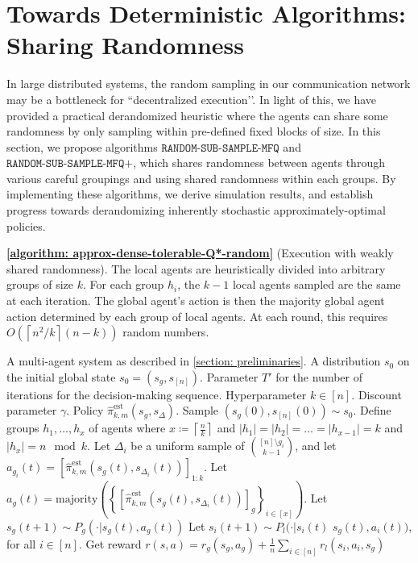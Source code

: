 \documentclass{article}
\theoremstyle{plain}
\theoremstyle{definition}
\def\ceil#1{\left\lceil #1 \right\rceil}
\def\est{\mathrm{est}}
\begin{document}



\section{Towards Deterministic Algorithms: Sharing Randomness}
\label{determinism}

 In large distributed systems, the random sampling in our communication network may be a bottleneck for ``decentralized execution’’. In light of this, we have provided a practical derandomized heuristic where the agents can share some randomness by only sampling within pre-defined fixed blocks of size. In this section, we propose algorithms $\texttt{RANDOM-SUB-SAMPLE-MFQ}$ and $\texttt{RANDOM-SUB-SAMPLE-MFQ+}$, which shares randomness between agents through various careful groupings and using shared randomness within each groups. By implementing these algorithms, we derive simulation results, and establish progress towards derandomizing inherently stochastic approximately-optimal policies.

\textbf{\cref{algorithm: approx-dense-tolerable-Q*-random}} (Execution with weakly shared randomness). The local agents are heuristically divided into arbitrary groups of size $k$. For each group $h_i$, the $k-1$ local agents sampled are the same at each iteration. The global agent's action is then the majority global agent action determined by each group of local agents. At each round, this requires $O(\ceil{n^2/k}(n-k))$ random numbers.

\begin{algorithm}[t]
\caption{\texttt{SUB-SAMPLE-MFQ}: Execution with weakly shared randomness} \label{algorithm: approx-dense-tolerable-Q*-random}
\begin{algorithmic}[1]
\REQUIRE 
A multi-agent system as described in \cref{section: preliminaries}. A distribution $s_0$ on the initial global state $s_0 = (s_g, s_{{[n]}})$. Parameter $T'$ for the number of iterations for the decision-making sequence. Hyperparameter $k \in [n]$. Discount parameter $\gamma$. Policy $\hat{\pi}^\est_{k,m}(s_g, s_\Delta)$.
\STATE Sample $(s_g(0), s_{[n]}(0)) \sim s_0$.
\STATE Define groups $h_1, \dots, h_x$ of agents where $x\coloneq \ceil{\frac{n}{k}}$ and $|h_1|=|h_2|=\dots=|h_{x-1}|=k$ and $|h_x|=n\mod k$.
\STATE Let $\Delta_i$ be a uniform sample of ${[n]\setminus g_i \choose k-1}$, and let $a_{g_i}(t) = [\hat{\pi}_{k,m}^\est(s_g(t), s_{\Delta_i}(t))]_{1:k}$.
\ENDFOR
\STATE Let $a_g(t) = \mathrm{majority}\left(\left\{[\hat{\pi}_{k,m}^\est(s_g(t),s_{\Delta_i}(t))]_g\right\}_{i\in[x]}\right)$.
\STATE Let $s_g(t+1) \sim P_g(\cdot|s_g(t), a_g(t))$
\STATE Let $s_i(t+1) \sim P_l(\cdot|s_i(t)$
\STATE $s_g(t),a_i(t))$, for all $i\in [n]$.
\STATE Get reward $r(s,a) = r_g(s_g, a_g) + \frac{1}{n}\sum_{i\in[n]}r_l(s_i,a_i,s_g)$
\ENDFOR
\end{algorithmic}
\end{algorithm}
\end{document}
